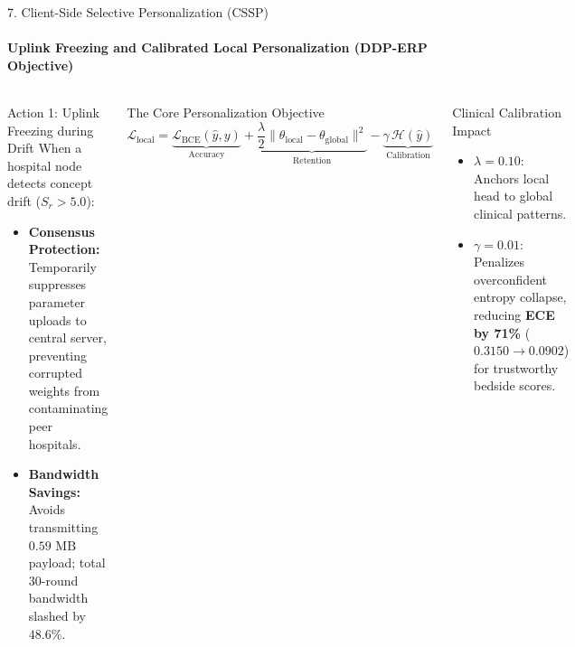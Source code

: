 \documentclass[aspectratio=169, 10pt]{beamer}
\begin{document}
\begin{frame}{7. Client-Side Selective Personalization (CSSP)}
    \framesubtitle{Uplink Freezing and Calibrated Local Personalization (DDP-ERP Objective)}
    \begin{columns}[T]
        \begin{block}{Action 1: Uplink Freezing during Drift}
            \scriptsize
            When a hospital node detects concept drift ($S_r > 5.0$):
            \begin{itemize}
                \setlength\itemsep{0.25em}
                \item \textbf{Consensus Protection:} Temporarily suppresses parameter uploads to central server, preventing corrupted weights from contaminating peer hospitals.
                \item \textbf{Bandwidth Savings:} Avoids transmitting $0.59\text{ MB}$ payload; total 30-round bandwidth slashed by $\mathbf{48.6\%}$.
            \end{itemize}
        \end{block}

        \begin{block}{The Core Personalization Objective}
            \centering
            \vspace{0.05cm}
            {\small
            $$\mathcal{L}_{\text{local}} = \underbrace{\mathcal{L}_{\text{BCE}}(\hat{y}, y)}_{\text{Accuracy}} + \underbrace{\frac{\lambda}{2} \|\theta_{\text{local}} - \theta_{\text{global}}\|^2}_{\text{Retention}} - \underbrace{\gamma \, \mathcal{H}(\hat{y})}_{\text{Calibration}}$$
            }
            \vspace{0.05cm}
        \end{block}

        \begin{exampleblock}{Clinical Calibration Impact}
            \scriptsize
            \begin{itemize}
                \setlength\itemsep{0.15em}
                \item $\lambda = 0.10$: Anchors local head to global clinical patterns.
                \item $\gamma = 0.01$: Penalizes overconfident entropy collapse, reducing \textbf{ECE by 71\%} ($0.3150 \rightarrow 0.0902$) for trustworthy bedside scores.
            \end{itemize}
        \end{exampleblock}
    \end{columns}
\end{frame}
\end{document}
